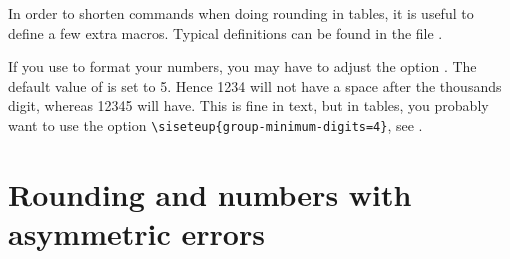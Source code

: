 \documentclass[REPORT=false, UKenglish]{atlasdoc}
\begin{document}
In order to shorten commands when doing rounding in tables, it is useful to define a few extra macros.
Typical definitions can be found in the file .

If you use  to format your numbers,
you may have to adjust the option .
 The default value of  is set to 5.
Hence \num{1234} will not have a space after the thousands digit,
whereas \num{12345} will have.
This is fine in text, but in tables, you probably want to use the option
\verb|\siseteup{group-minimum-digits=4}|,
see .

\begin{table}[htbp]
\begin{tcblisting}{}
  \caption{Tables comparing different  values
  for the package .}
  \label{tab:minimum-digits}
  \centering
  \qquad
\end{tcblisting}
\end{table}

\clearpage

\section{Rounding and numbers with asymmetric errors}%
\label{sec:tips:pmerr}
\end{document}
